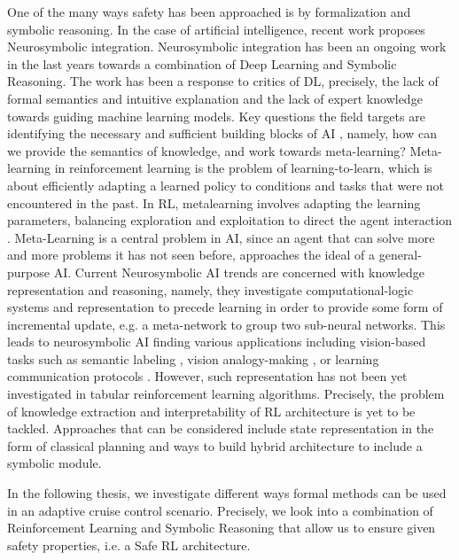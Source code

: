 \documentclass[a4paper,11pt]{article}
\begin{document}
\medskip

One of the many ways safety has been approached is by formalization and symbolic reasoning. 
In the case of artificial intelligence, recent work proposes Neurosymbolic integration. 
Neurosymbolic integration has been an ongoing work in the last years towards a combination of Deep Learning and Symbolic Reasoning.
The work has been a response to critics of DL, precisely, the lack of formal semantics and intuitive explanation and the lack of expert knowledge towards guiding machine learning models. 
Key questions the field targets are identifying the necessary and sufficient building blocks of AI \cite{garcez2020neurosymbolic}, namely, how can we provide the semantics of knowledge, 
and work towards meta-learning? Meta-learning in reinforcement learning is the problem of learning-to-learn, which is about efficiently
adapting a learned policy to conditions and tasks that were not encountered in the past. In RL, metalearning
involves adapting the learning parameters, balancing exploration and exploitation to direct the
agent interaction \cite{gupta_meta-reinforcement_2018,schweighofer_meta-learning_2003}. Meta-Learning is a central problem in AI, since an agent that can solve more
and more problems it has not seen before, approaches the ideal of a general-purpose AI. \newline
Current Neurosymbolic AI trends are concerned with knowledge representation and reasoning, namely, they investigate computational-logic systems 
and representation to precede learning in order to provide some form of incremental update, e.g. a meta-network to group two sub-neural networks. \cite{Besold2017NeuralSymbolicLA}
This leads to neurosymbolic AI finding various applications including vision-based tasks such as semantic labeling \cite{vinyals2015, karpathy2015}, 
vision analogy-making \cite{Reed2015DeepVA}, or learning communication protocols \cite{Foerster2016LearningTC}.
However, such representation has not been yet investigated in tabular reinforcement learning algorithms. Precisely, the problem of knowledge extraction and interpretability of RL architecture is yet to be tackled. 
Approaches that can be considered include state representation in the form of classical planning and ways to build hybrid architecture to include a symbolic module. 

\medskip



In the following thesis, we investigate different ways formal methods can be used in an adaptive cruise control scenario. Precisely, we look into a combination of Reinforcement Learning
and Symbolic Reasoning that allow us to ensure given safety properties, i.e. a Safe RL architecture. 
\end{document}
